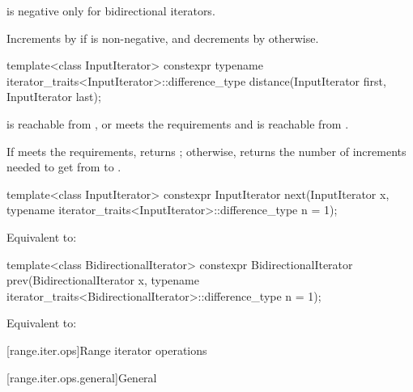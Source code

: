 \begin{itemdescr}
\pnum
\expects
{}
is negative only for bidirectional iterators.

\pnum
\effects
Increments  by  if  is non-negative, and
decrements  by  otherwise.
\end{itemdescr}

%
\begin{itemdecl}
template<class InputIterator>
  constexpr typename iterator_traits<InputIterator>::difference_type
    distance(InputIterator first, InputIterator last);
\end{itemdecl}

\begin{itemdescr}
\pnum
\expects
{} is reachable from , or
 meets
the  requirements and
 is reachable from .

\pnum
\effects
If  meets the  requirements,
returns ; otherwise, returns
the number of increments needed to get from
to
.
\end{itemdescr}

%
\begin{itemdecl}
template<class InputIterator>
  constexpr InputIterator next(InputIterator x,
    typename iterator_traits<InputIterator>::difference_type n = 1);
\end{itemdecl}

\begin{itemdescr}
\pnum
\effects
Equivalent to: 
\end{itemdescr}

%
\begin{itemdecl}
template<class BidirectionalIterator>
  constexpr BidirectionalIterator prev(BidirectionalIterator x,
    typename iterator_traits<BidirectionalIterator>::difference_type n = 1);
\end{itemdecl}

\begin{itemdescr}
\pnum
\effects
Equivalent to: 
\end{itemdescr}

[range.iter.ops]{Range iterator operations}

[range.iter.ops.general]{General}

